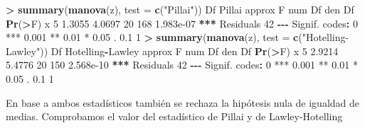 \documentclass[
  a4paper,
  oneside]{scrbook}
\newenvironment{Shaded}{\begin{snugshade}}{\end{snugshade}}
\newcommand{\AttributeTok}[1]{\textcolor[rgb]{0.13,0.29,0.53}{#1}}
\newcommand{\DecValTok}[1]{\textcolor[rgb]{0.00,0.00,0.81}{#1}}
\newcommand{\ErrorTok}[1]{\textcolor[rgb]{0.64,0.00,0.00}{\textbf{#1}}}
\newcommand{\FloatTok}[1]{\textcolor[rgb]{0.00,0.00,0.81}{#1}}
\newcommand{\FunctionTok}[1]{\textcolor[rgb]{0.13,0.29,0.53}{\textbf{#1}}}
\newcommand{\NormalTok}[1]{#1}
\newcommand{\SpecialCharTok}[1]{\textcolor[rgb]{0.81,0.36,0.00}{\textbf{#1}}}
\newcommand{\StringTok}[1]{\textcolor[rgb]{0.31,0.60,0.02}{#1}}
\theoremstyle{definition}
\theoremstyle{definition}
\theoremstyle{definition}
\theoremstyle{definition}
\theoremstyle{remark}
\begin{document}
\footnotesize

\begin{Shaded}
\begin{Highlighting}[]
\SpecialCharTok{\textgreater{}} \FunctionTok{summary}\NormalTok{(}\FunctionTok{manova}\NormalTok{(z), }\AttributeTok{test =} \FunctionTok{c}\NormalTok{(}\StringTok{"Pillai"}\NormalTok{))}
\NormalTok{          Df Pillai approx F num Df den Df    }\FunctionTok{Pr}\NormalTok{(}\SpecialCharTok{\textgreater{}}\NormalTok{F)    }
\NormalTok{x          }\DecValTok{5} \FloatTok{1.3055}   \FloatTok{4.0697}     \DecValTok{20}    \DecValTok{168} \FloatTok{1.983e{-}07} \SpecialCharTok{**}\ErrorTok{*}
\NormalTok{Residuals }\DecValTok{42}                                            
\SpecialCharTok{{-}{-}{-}}
\NormalTok{Signif. codes}\SpecialCharTok{:}  \DecValTok{0} \StringTok{\textquotesingle{}***\textquotesingle{}} \FloatTok{0.001} \StringTok{\textquotesingle{}**\textquotesingle{}} \FloatTok{0.01} \StringTok{\textquotesingle{}*\textquotesingle{}} \FloatTok{0.05} \StringTok{\textquotesingle{}.\textquotesingle{}} \FloatTok{0.1} \StringTok{\textquotesingle{} \textquotesingle{}} \DecValTok{1}
\SpecialCharTok{\textgreater{}} \FunctionTok{summary}\NormalTok{(}\FunctionTok{manova}\NormalTok{(z), }\AttributeTok{test =} \FunctionTok{c}\NormalTok{(}\StringTok{"Hotelling{-}Lawley"}\NormalTok{))}
\NormalTok{          Df Hotelling}\SpecialCharTok{{-}}\NormalTok{Lawley approx F num Df den Df    }\FunctionTok{Pr}\NormalTok{(}\SpecialCharTok{\textgreater{}}\NormalTok{F)    }
\NormalTok{x          }\DecValTok{5}           \FloatTok{2.9214}   \FloatTok{5.4776}     \DecValTok{20}    \DecValTok{150} \FloatTok{2.568e{-}10} \SpecialCharTok{**}\ErrorTok{*}
\NormalTok{Residuals }\DecValTok{42}                                                      
\SpecialCharTok{{-}{-}{-}}
\NormalTok{Signif. codes}\SpecialCharTok{:}  \DecValTok{0} \StringTok{\textquotesingle{}***\textquotesingle{}} \FloatTok{0.001} \StringTok{\textquotesingle{}**\textquotesingle{}} \FloatTok{0.01} \StringTok{\textquotesingle{}*\textquotesingle{}} \FloatTok{0.05} \StringTok{\textquotesingle{}.\textquotesingle{}} \FloatTok{0.1} \StringTok{\textquotesingle{} \textquotesingle{}} \DecValTok{1}
\end{Highlighting}
\end{Shaded}

\normalsize

En base a ambos estadísticos también se rechaza la hipótesis nula de
igualdad de medias. Comprobamos el valor del estadístico de Pillai y de Lawley-Hotelling
\end{document}
